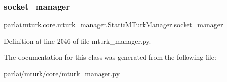 \subsubsection{\texorpdfstring{socket\+\_\+manager}{socket\_manager}}
{\footnotesize\ttfamily parlai.\+mturk.\+core.\+mturk\+\_\+manager.\+Static\+M\+Turk\+Manager.\+socket\+\_\+manager}



Definition at line 2046 of file mturk\+\_\+manager.\+py.



The documentation for this class was generated from the following file\+:\begin{DoxyCompactItemize}
\item 
parlai/mturk/core/\hyperlink{mturk__manager_8py}{mturk\+\_\+manager.\+py}\end{DoxyCompactItemize}

